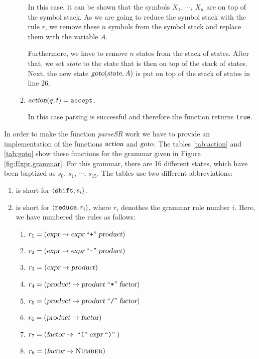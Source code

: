 \begin{enumerate}
\begin{enumerate}
            In this case, it can be shown that the symbols $X_1$, $\cdots$, $X_n$ are on top of the
            symbol stack.  As we are going to reduce the symbol stack with the rule $r$,
            we remove these $n$ symbols from the symbol stack and replace them with the
            variable $A$.
            
            Furthermore, we have to remove $n$ states from the stack of states.
            After that, we set \textsl{state} to the state that is then on top of the
            stack of states.  Next, the new state  $\textsl{goto}(\textsl{state}, A)$ is put on top of
            the stack of states in line 26.
      \item $\textsl{action}(q,t) = \texttt{accept}$.

            In this case parsing is successful and therefore the function returns \texttt{true}.
      \end{enumerate}
\end{enumerate}
In order to make the function \textsl{parseSR} work we have to provide an implementation
of the functions $\textsl{action}$ and $\textsl{goto}$.
The tables  \ref{tab:action} and \ref{tab:goto} show these functions for the grammar given
in Figure \ref{fig:Expr.grammar}.  For this grammar, there are 16 different states, which have
been baptized as $s_0$, $s_1$, $\cdots$, $s_{15}$.  The tables use two different abbreviations:
\begin{enumerate}
\item {} is short for $\pair(\texttt{shift}, s_i)$.
\item {} is short for  $\pair(\texttt{reduce}, r_i)$, where $r_i$ denothes the
      grammar rule number $i$.  Here, we have numbered the rules as follows:
      \begin{enumerate}
      \item $r_1 = (\textsl{expr} \rightarrow \textsl{expr} \;\mbox{``\texttt{+}''}\; \textsl{product})$
      \item $r_2 = (\textsl{expr} \rightarrow \textsl{expr} \;\mbox{``\texttt{-}''}\; \textsl{product})$
      \item $r_3 = (\textsl{expr} \rightarrow \textsl{product})$
      \item $r_4 = (\textsl{product} \rightarrow \textsl{product} \;\mbox{``\texttt{*}''}\; \textsl{factor})$
      \item $r_5 = (\textsl{product} \rightarrow \textsl{product} \;\mbox{``\texttt{/}''}\; \textsl{factor})$
      \item $r_6 = (\textsl{product} \rightarrow \textsl{factor})$
      \item $r_7 = (\textsl{factor} \rightarrow  \;\mbox{``\texttt{(}''}\; \textsl{expr} \;\mbox{``\texttt{)}''}\;)$
      \item $r_8 = (\textsl{factor} \rightarrow  \textsc{Number})$
      \end{enumerate}
\end{enumerate}
